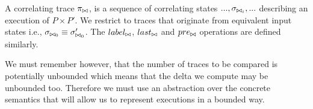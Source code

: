 \begin{definition}
A correlating trace $\pi_{\bowtie}$, is a sequence of correlating states $..., \sigma_{\bowtie_{i}}, ...$ describing an execution of $P \times P'$. We restrict to traces that originate from equivalent input states i.e., $\sigma_{\bowtie_{0}} \equiv \sigma'_{\bowtie_{0}}$. The $label_{\bowtie}$, $last_{\bowtie}$ and $pre_{\bowtie}$ operations are defined similarly.
\end{definition}

We must remember however, that the number of traces to be compared is potentially unbounded which means that the delta we compute may be unbounded too. Therefore we must use an abstraction over the concrete semantics that will allow us to represent executions in a bounded way. 